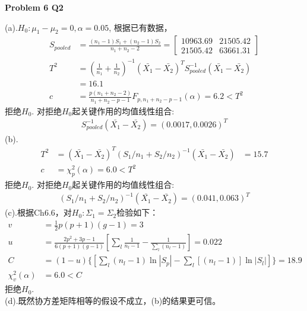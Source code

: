 \documentclass[UTF8,12pt]{article}
\newenvironment{problem}[2][Problem]
{ \begin{mdframed}[backgroundcolor=gray!20] \textbf{#1 #2}}
	{  \end{mdframed}}
\newenvironment{answer}
{%
}
{}
\newenvironment{eq}
{
	\begin{equation}
		\begin{aligned}\nonumber
}
{
		\end{aligned}
	\end{equation}
}
\begin{document}
\begin{problem}{6 Q2}
\end{problem}
\begin{answer}
	(a).$H_0:\mu_1-\mu_2=0,\alpha=0.05$, 根据已有数据，
	\begin{eq}
		S_{pooled}&=\frac{(n_1-1)S_1+(n_2-1)S_2}{n_1+n_2-2}
		=\begin{bmatrix}
			10963.69 & 21505.42\\
			21505.42 & 63661.31
		\end{bmatrix}\\
		T^2&=(\frac{1}{n_1}+\frac{1}{n_2})^{-1} (\bar{X_1}-\bar{X_2})^T
		S_{pooled}^{-1} (\bar{X_1}-\bar{X_2})\\
		&= 16.1\\
		c &= \frac{p(n_1+n_2-2)}{n_1+n_2-p-1}F_{p,n_1+n_2-p-1}(\alpha) = 6.2 <T^2
	\end{eq}
	拒绝$H_0$. 对拒绝$H_0$起关键作用的均值线性组合:
	\begin{eq}
		S_{pooled}^{-1}(\bar{X_1}-\bar{X_2})=(0.0017,0.0026)^T
	\end{eq}
	(b).
	\begin{eq}
		T^2 &= (\bar{X_1}-\bar{X_2})^T (S_1/n_1+S_2/n_2)^{-1} (\bar{X_1}-\bar{X_2})
		&= 15.7\\
		c &= \chi^2_p(\alpha) = 6.0 < T^2
	\end{eq}
	拒绝$H_0$. 对拒绝$H_0$起关键作用的均值线性组合:
	\begin{eq}
		(S_1/n_1+S_2/n_2)^{-1} (\bar{X_1}-\bar{X_2})=(0.041,0.063)^T
	\end{eq}
	(c).根据Ch6.6，对$H_0:\Sigma_1=\Sigma_2$检验如下：
	\begin{eq}
		v &=\frac{1}{2}p(p+1)(g-1)=3\\
		u &= \frac{2p^2+3p-1}{6(p+1)(g-1)}
		[\sum_l \frac{1}{n_l-1}-\frac{1}{\sum_l (n_l-1)}]
		=0.022\\
		C &= (1-u)\{[\sum_l (n_l-1)\ln{|S_p|}-\sum_l[(n_l-1)]\ln{|S_l|}]\}
		= 18.9\\
		\chi^2_v(\alpha) &= 6.0 < C
	\end{eq}
	拒绝$H_0$.\\
	(d).既然协方差矩阵相等的假设不成立，(b)的结果更可信。
\end{answer}
\end{document}
